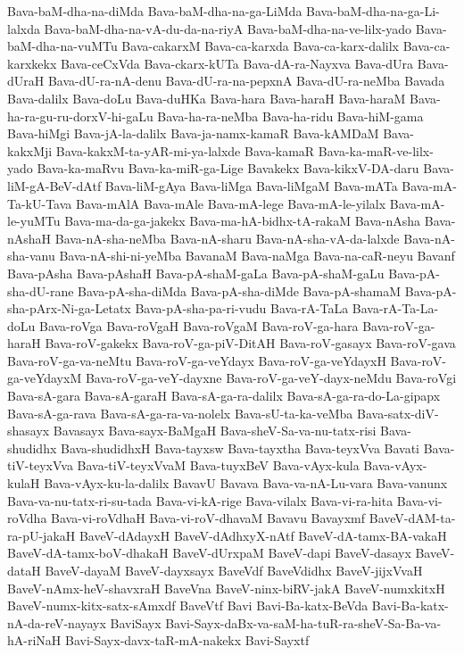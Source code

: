 {Bava-baM-dha-na-diMda
Bava-baM-dha-na-ga-LiMda
Bava-baM-dha-na-ga-Li-lalxda
Bava-baM-dha-na-vA-du-da-na-riyA
Bava-baM-dha-na-ve-lilx-yado
Bava-baM-dha-na-vuMTu
Bava-cakarxM
Bava-ca-karxda
Bava-ca-karx-dalilx
Bava-ca-karxkekx
Bava-ceCxVda
Bava-ckarx-kUTa
Bava-dA-ra-Nayxva
Bava-dUra
Bava-dUraH
Bava-dU-ra-nA-denu
Bava-dU-ra-na-pepxnA
Bava-dU-ra-neMba
Bavada
Bava-dalilx
Bava-doLu
Bava-duHKa
Bava-hara
Bava-haraH
Bava-haraM
Bava-ha-ra-gu-ru-dorxV-hi-gaLu
Bava-ha-ra-neMba
Bava-ha-ridu
Bava-hiM-gama
Bava-hiMgi
Bava-jA-la-dalilx
Bava-ja-namx-kamaR
Bava-kAMDaM
Bava-kakxMji
Bava-kakxM-ta-yAR-mi-ya-lalxde
Bava-kamaR
Bava-ka-maR-ve-lilx-yado
Bava-ka-maRvu
Bava-ka-miR-ga-Lige
Bavakekx
Bava-kikxV-DA-daru
Bava-liM-gA-BeV-dAtf
Bava-liM-gAya
Bava-liMga
Bava-liMgaM
Bava-mATa
Bava-mA-Ta-kU-Tava
Bava-mAlA
Bava-mAle
Bava-mA-lege
Bava-mA-le-yilalx
Bava-mA-le-yuMTu
Bava-ma-da-ga-jakekx
Bava-ma-hA-bidhx-tA-rakaM
Bava-nAsha
Bava-nAshaH
Bava-nA-sha-neMba
Bava-nA-sharu
Bava-nA-sha-vA-da-lalxde
Bava-nA-sha-vanu
Bava-nA-shi-ni-yeMba
BavanaM
Bava-naMga
Bava-na-caR-neyu
Bavanf
Bava-pAsha
Bava-pAshaH
Bava-pA-shaM-gaLa
Bava-pA-shaM-gaLu
Bava-pA-sha-dU-rane
Bava-pA-sha-diMda
Bava-pA-sha-diMde
Bava-pA-shamaM
Bava-pA-sha-pArx-Ni-ga-Letatx
Bava-pA-sha-pa-ri-vudu
Bava-rA-TaLa
Bava-rA-Ta-La-doLu
Bava-roVga
Bava-roVgaH
Bava-roVgaM
Bava-roV-ga-hara
Bava-roV-ga-haraH
Bava-roV-gakekx
Bava-roV-ga-piV-DitAH
Bava-roV-gasayx
Bava-roV-gava
Bava-roV-ga-va-neMtu
Bava-roV-ga-veYdayx
Bava-roV-ga-veYdayxH
Bava-roV-ga-veYdayxM
Bava-roV-ga-veY-dayxne
Bava-roV-ga-veY-dayx-neMdu
Bava-roVgi
Bava-sA-gara
Bava-sA-garaH
Bava-sA-ga-ra-dalilx
Bava-sA-ga-ra-do-La-gipapx
Bava-sA-ga-rava
Bava-sA-ga-ra-va-nolelx
Bava-sU-ta-ka-veMba
Bava-satx-diV-shasayx
Bavasayx
Bava-sayx-BaMgaH
Bava-sheV-Sa-va-nu-tatx-risi
Bava-shudidhx
Bava-shudidhxH
Bava-tayxsw
Bava-tayxtha
Bava-teyxVva
Bavati
Bava-tiV-teyxVva
Bava-tiV-teyxVvaM
Bava-tuyxBeV
Bava-vAyx-kula
Bava-vAyx-kulaH
Bava-vAyx-ku-la-dalilx
BavavU
Bavava
Bava-va-nA-Lu-vara
Bava-vanunx
Bava-va-nu-tatx-ri-su-tada
Bava-vi-kA-rige
Bava-vilalx
Bava-vi-ra-hita
Bava-vi-roVdha
Bava-vi-roVdhaH
Bava-vi-roV-dhavaM
Bavavu
Bavayxmf
BaveV-dAM-ta-ra-pU-jakaH
BaveV-dAdayxH
BaveV-dAdhxyX-nAtf
BaveV-dA-tamx-BA-vakaH
BaveV-dA-tamx-boV-dhakaH
BaveV-dUrxpaM
BaveV-dapi
BaveV-dasayx
BaveV-dataH
BaveV-dayaM
BaveV-dayxsayx
BaveVdf
BaveVdidhx
BaveV-jijxVvaH
BaveV-nAmx-heV-shavxraH
BaveVna
BaveV-ninx-biRV-jakA
BaveV-numxkitxH
BaveV-numx-kitx-satx-sAmxdf
BaveVtf
Bavi
Bavi-Ba-katx-BeVda
Bavi-Ba-katx-nA-da-reV-nayayx
BaviSayx
Bavi-Sayx-daBx-va-saM-ha-tuR-ra-sheV-Sa-Ba-va-hA-riNaH
Bavi-Sayx-davx-taR-mA-nakekx
Bavi-Sayxtf
}
